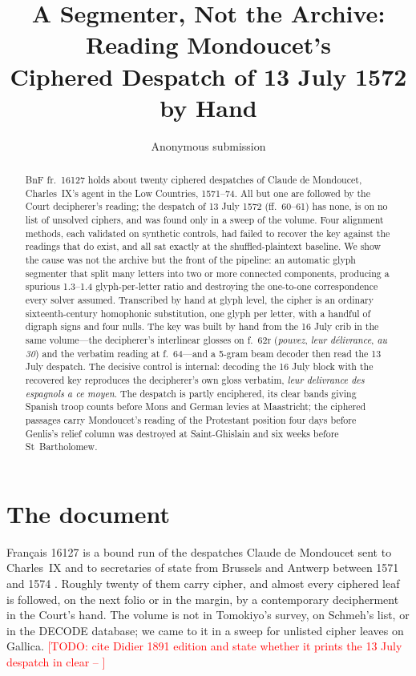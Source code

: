 \documentclass[11pt]{article}
\title{A Segmenter, Not the Archive: Reading Mondoucet's \\ Ciphered Despatch of 13 July 1572 by Hand}
\author{Anonymous submission}
\date{}
\newcommand{\todo}[1]{\textcolor{red}{[TODO: #1]}}
\begin{document}
\maketitle

\begin{abstract}
BnF fr.~16127 holds about twenty ciphered despatches of Claude de Mondoucet, Charles~IX's agent in the Low Countries, 1571--74. All but one are followed by the Court decipherer's reading; the despatch of 13 July 1572 (ff.~60--61) has none, is on no list of unsolved ciphers, and was found only in a sweep of the volume. Four alignment methods, each validated on synthetic controls, had failed to recover the key against the readings that do exist, and all sat exactly at the shuffled-plaintext baseline. We show the cause was not the archive but the front of the pipeline: an automatic glyph segmenter that split many letters into two or more connected components, producing a spurious 1.3--1.4 glyph-per-letter ratio and destroying the one-to-one correspondence every solver assumed. Transcribed by hand at glyph level, the cipher is an ordinary sixteenth-century homophonic substitution, one glyph per letter, with a handful of digraph signs and four nulls. The key was built by hand from the 16 July crib in the same volume---the decipherer's interlinear glosses on f.~62r (\emph{pouvez}, \emph{leur d\'elivrance}, \emph{au 30}) and the verbatim reading at f.~64---and a 5-gram beam decoder then read the 13 July despatch. The decisive control is internal: decoding the 16 July block with the recovered key reproduces the decipherer's own gloss verbatim, \emph{leur delivrance des espagnols a ce moyen}. The despatch is partly enciphered, its clear bands giving Spanish troop counts before Mons and German levies at Maastricht; the ciphered passages carry Mondoucet's reading of the Protestant position four days before Genlis's relief column was destroyed at Saint-Ghislain and six weeks before St~Bartholomew.
\end{abstract}

\section{The document}

Fran\c{c}ais 16127 is a bound run of the despatches Claude de Mondoucet sent to Charles~IX and to secretaries of state from Brussels and Antwerp between 1571 and 1574 \cite{BnF:fr16127}. Roughly twenty of them carry cipher, and almost every ciphered leaf is followed, on the next folio or in the margin, by a contemporary decipherment in the Court's hand. The volume is not in Tomokiyo's survey, on Schmeh's list, or in the DECODE database; we came to it in a sweep for unlisted cipher leaves on Gallica. \todo{cite Didier 1891 edition and state whether it prints the 13 July despatch in clear -- \cite{Didier:1891}}
\end{document}
